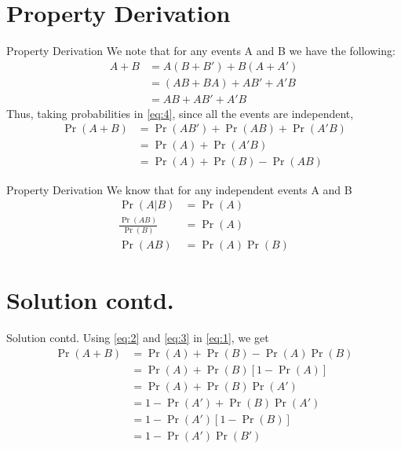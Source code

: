 \documentclass{beamer}
\providecommand{\pr}[1]{\ensuremath{\Pr\left(#1\right)}}
\begin{document}
\section{Property Derivation}
\begin{frame}{Property Derivation}
We note that for any events A and B we have the following:
\begin{align}
A + B &= A(B + B') + B(A + A') \\
&= (AB + BA) + AB' + A'B \\
&= AB + AB' + A'B
\label{eq:4}
\end{align}
Thus, taking probabilities in \eqref{eq:4}, since all the events are independent,
\begin{align}
\pr{A + B} &= \pr{AB'} + \pr{AB} + \pr{A'B} \\
&= \pr{A} + \pr{A'B} \\
&= \pr{A} + \pr{B} - \pr{AB}
\label{eq:5}
\end{align}
\end{frame}

\begin{frame}{Property Derivation}
    We know that for any independent events A and B 
    \begin{align}
        \pr{A|B} &= \pr{A}\\
        \frac{\pr{AB}}{\pr{B}}&= \pr{A}\\
        \pr{AB} &= \pr{A}\pr{B}
    \end{align}
\end{frame}


\section{Solution contd.}
\begin{frame}{Solution contd.}
Using \eqref{eq:2} and \eqref{eq:3} in \eqref{eq:1}, we get
\begin{align}
    \pr{A+B} &= \pr{A} + \pr{B} - \pr{A}\pr{B}\\
    &= \pr{A} + \pr{B}[1-\pr{A}]\\
    &= \pr{A} + \pr{B}\pr{A'}\\
    &= 1 - \pr{A'} + \pr{B}\pr{A'}\\
    &= 1 - \pr{A'}[1 - \pr{B}]\\
    &= 1 - \pr{A'}\pr{B'}
\end{align}
\end{frame}
\end{document}
